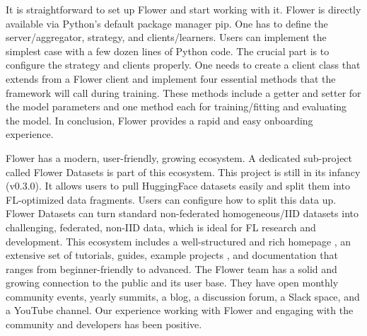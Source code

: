 It is straightforward to set up Flower and start working with it.
Flower is directly available via Python's default package manager pip.
One has to define the server/aggregator, strategy, and clients/learners.
Users can implement the simplest case with a few dozen lines of Python code.
The crucial part is to configure the strategy and clients properly.
One needs to create a client class that extends from a Flower client and implement four essential methods that the framework will call during training.
These methods include a getter and setter for the model parameters and one method each for training/fitting and evaluating the model.
In conclusion, Flower provides a rapid and easy onboarding experience.

Flower has a modern, user-friendly, growing ecosystem.
A dedicated sub-project called Flower Datasets \cite{flower:datasets} is part of this ecosystem.
This project is still in its infancy (v0.3.0).
It allows users to pull HuggingFace \cite{hugging_face_homepage} datasets easily and split them into FL-optimized data fragments.
Users can configure how to split this data up.
Flower Datasets can turn standard non-federated homogeneous/IID datasets into challenging, federated, non-IID data, which is ideal for FL research and development.
This ecosystem includes a well-structured and rich homepage \cite{flower:homepage}, an extensive set of tutorials, guides, example projects \cite{flower:examples}, and documentation \cite{flower:homepage_docs, flower_docs} that ranges from beginner-friendly to advanced.
The Flower team has a solid and growing connection to the public and its user base.
They have open monthly community events, yearly summits, a blog, a discussion forum, a Slack space, and a YouTube channel.
Our experience working with Flower and engaging with the community and developers has been positive.
